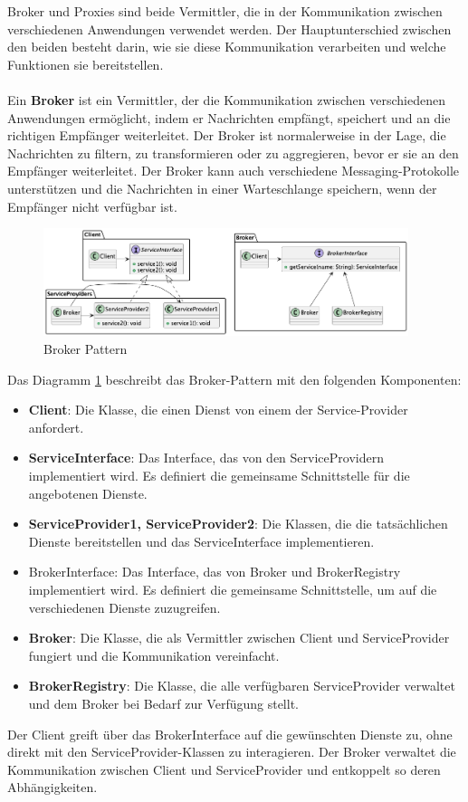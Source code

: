 \documentclass[../vs-script-first-v01.tex]{subfiles}
\begin{document}
Broker und Proxies sind beide Vermittler, die in der Kommunikation zwischen verschiedenen Anwendungen verwendet werden. Der Hauptunterschied zwischen den beiden besteht darin, wie sie diese Kommunikation verarbeiten und welche Funktionen sie bereitstellen.
\\\\
Ein \textbf{Broker} ist ein Vermittler, der die Kommunikation zwischen verschiedenen Anwendungen ermöglicht, indem er Nachrichten empfängt, speichert und an die richtigen Empfänger weiterleitet. Der Broker ist normalerweise in der Lage, die Nachrichten zu filtern, zu transformieren oder zu aggregieren, bevor er sie an den Empfänger weiterleitet. Der Broker kann auch verschiedene Messaging-Protokolle unterstützen und die Nachrichten in einer Warteschlange speichern, wenn der Empfänger nicht verfügbar ist. 

\begin{figure}[ht]
  \centering
  \includegraphics[width=0.95\textwidth]{fig/uml/broker.png}
  \caption{Broker Pattern}
  \label{fig:broker}
\end{figure}

Das Diagramm \ref{fig:broker} beschreibt das Broker-Pattern mit den folgenden Komponenten:
\begin{itemize}
\item \textbf{Client}: Die Klasse, die einen Dienst von einem der Service-Provider anfordert.
\item \textbf{ServiceInterface}: Das Interface, das von den ServiceProvidern implementiert wird. Es definiert die gemeinsame Schnittstelle für die angebotenen Dienste.
\item \textbf{ServiceProvider1, ServiceProvider2}: Die Klassen, die die tatsächlichen Dienste bereitstellen und das ServiceInterface implementieren.
\item BrokerInterface: Das Interface, das von Broker und BrokerRegistry implementiert wird. Es definiert die gemeinsame Schnittstelle, um auf die verschiedenen Dienste zuzugreifen.
\item \textbf{Broker}: Die Klasse, die als Vermittler zwischen Client und ServiceProvider fungiert und die Kommunikation vereinfacht.
\item \textbf{BrokerRegistry}: Die Klasse, die alle verfügbaren ServiceProvider verwaltet und dem Broker bei Bedarf zur Verfügung stellt.
\end{itemize}
Der Client greift über das BrokerInterface auf die gewünschten Dienste zu, ohne direkt mit den ServiceProvider-Klassen zu interagieren. Der Broker verwaltet die Kommunikation zwischen Client und ServiceProvider und entkoppelt so deren Abhängigkeiten.
\end{document}
